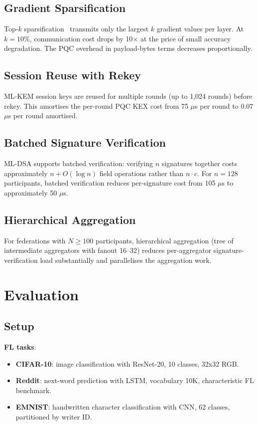 \documentclass[sigconf,nonacm]{acmart}
\begin{document}
\subsection{Gradient Sparsification}

Top-$k$ sparsification~\cite{aji2017topk} transmits only the largest
$k$ gradient values per layer. At $k = 10\%$, communication cost
drops by 10$\times$ at the price of small accuracy degradation. The
PQC overhead in payload-bytes terms decreases proportionally.

\subsection{Session Reuse with Rekey}

ML-KEM session keys are reused for multiple rounds (up to 1{,}024
rounds) before rekey. This amortises the per-round PQC KEX cost from
75 $\mu$s per round to 0.07 $\mu$s per round amortised.

\subsection{Batched Signature Verification}

ML-DSA supports batched verification: verifying $n$ signatures
together costs approximately $n + O(\log n)$ field operations
rather than $n \cdot c$. For $n = 128$ participants, batched
verification reduces per-signature cost from 105 $\mu$s to
approximately 50 $\mu$s.

\subsection{Hierarchical Aggregation}

For federations with $N \geq 100$ participants, hierarchical
aggregation (tree of intermediate aggregators with fanout 16--32)
reduces per-aggregator signature-verification load substantially
and parallelises the aggregation work.

\section{Evaluation}

\subsection{Setup}

\textbf{FL tasks}:
\begin{itemize}
  \item \textbf{CIFAR-10}: image classification with ResNet-20,
        10 classes, 32x32 RGB.
  \item \textbf{Reddit}: next-word prediction with LSTM,
        vocabulary 10K, characteristic FL benchmark.
  \item \textbf{EMNIST}: handwritten character classification
        with CNN, 62 classes, partitioned by writer ID.
\end{itemize}
\end{document}
